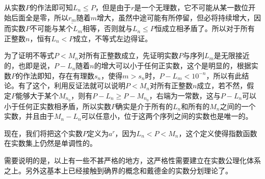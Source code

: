 从实数$P$的作法即可知$L_n \leqslant P$，但是由于$r$是一个无理数，它不可能从某一数位开始后面全是零，所以$\underline{r_m}$随着$m$增大，虽然中途可能有所停留，但必将持续增大，因而实数$P$不可能与某个$L_m$相等，否则就与$L_n \leqslant P$恒成立相矛盾了。所以对于所有正整数$n$，恒有$L_n < P$成立，不等式左边得证。

为了证明不等式$P<M_n$对所有正整数成立，先证明实数$P$与序列$L_m$是无限接近的，也即是说，$P-L_n$随着$n$的增大可以小于任何正实数，这个是明显的，根据实数$P$的作法即知，存在有理数$s_n$，使得$m>s_n$时，$P-L_m<10^{-n}$，所以有此结论。有了这个，利用反证法就可以说明$P<M_n$对所有正整数$n$成立，若不然，假定$P$能够大于某个$M_{n_0}$，则有$P-L_n \geqslant P-M_{n_0}$，右端为一常数，这与$P-L_n$可以小于任何正实数相矛盾，所以实数$P$确实是介于所有的$L_n$和所有的$M_n$之间的一个实数，并且由于$M_n-L_n$可以任意小，位于这两个序列之间的实数也是唯一的。

现在，我们将把这个实数$P$定义为$a^r$，因为$L_n < P < M_n$，这个定义使得指数函数在实数集上仍然是单调性的。

需要说明的是，以上有一些不甚严格的地方，这严格性需要建立在实数公理化体系之上。另外这基本上已经接触到确界的概念和戴德金的实数分划理论了。




